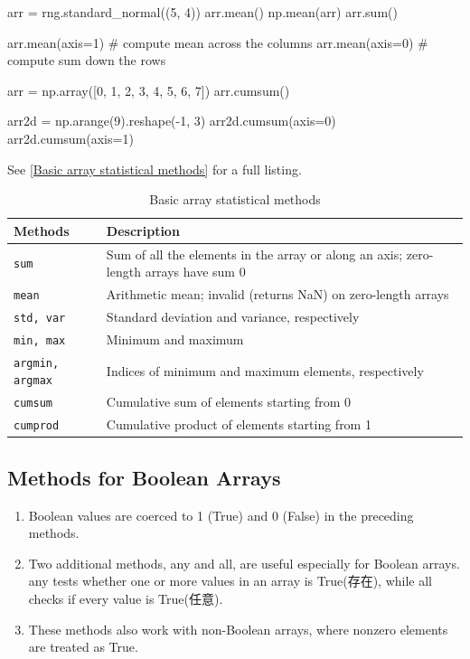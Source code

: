 \begin{pyc}
arr = rng.standard_normal((5, 4))
arr.mean()
np.mean(arr)
arr.sum()

arr.mean(axis=1)
# compute mean across the columns
arr.mean(axis=0)
# compute sum down the rows

arr = np.array([0, 1, 2, 3, 4, 5, 6, 7])
arr.cumsum()

arr2d = np.arange(9).reshape(-1, 3)
arr2d.cumsum(axis=0)
arr2d.cumsum(axis=1)
\end{pyc}

See \autoref{Basic array statistical methods} for a full listing.

\begin{table}
    \caption{Basic array statistical methods}
    \label{Basic array statistical methods}
    \begin{tabularx}{\textwidth}{lX}
        \hline
        Methods        & Description                                                                          \\
        \hline
        \verb|sum|            & Sum of all the elements in the array or along an axis; zero-length arrays have sum 0 \\
        \verb|mean|           & Arithmetic mean; invalid (returns NaN) on zero-length arrays                         \\
        \verb|std, var|       & Standard deviation and variance, respectively                                        \\
        \verb|min, max|       & Minimum and maximum                                                                  \\
        \verb|argmin, argmax| & Indices of minimum and maximum elements, respectively                                \\
        \verb|cumsum|         & Cumulative sum of elements starting from 0                                           \\
        \verb|cumprod|        & Cumulative product of elements starting from 1                                       \\
        \hline
    \end{tabularx}
\end{table}

\subsection{Methods for Boolean Arrays}
\begin{enumerate}
    \item Boolean values are coerced to 1 (True) and 0 (False) in the preceding methods. 
    \item Two additional methods, any and all, are useful especially for Boolean arrays. any tests whether one or more values in an array is True(存在), while all checks if every value is True(任意).
    \item These methods also work with non-Boolean arrays, where nonzero elements are treated as True.
\end{enumerate}

